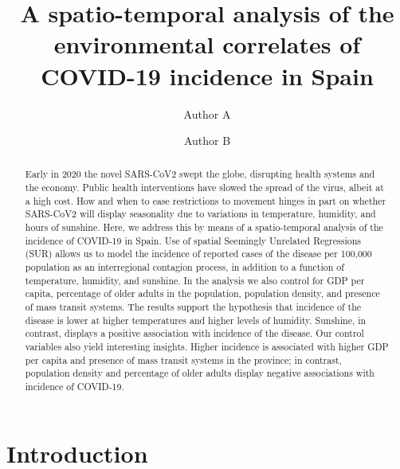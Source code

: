 \documentclass[]{elsarticle} %
\begin{document}
\begin{frontmatter}

  \title{A spatio-temporal analysis of the environmental correlates of COVID-19
incidence in Spain}
    \author[Some School]{Author A}
    \author[Some Institute]{Author B}
      \address[Some School]{School of the Things}
    \address[Some Institute]{Institute of Everything}
    \address[Departamento de Economia]{}
  
  \begin{abstract}
  Early in 2020 the novel SARS-CoV2 swept the globe, disrupting health
  systems and the economy. Public health interventions have slowed the
  spread of the virus, albeit at a high cost. How and when to ease
  restrictions to movement hinges in part on whether SARS-CoV2 will
  display seasonality due to variations in temperature, humidity, and
  hours of sunshine. Here, we address this by means of a spatio-temporal
  analysis of the incidence of COVID-19 in Spain. Use of spatial Seemingly
  Unrelated Regressions (SUR) allows us to model the incidence of reported
  cases of the disease per 100,000 population as an interregional
  contagion process, in addition to a function of temperature, humidity,
  and sunshine. In the analysis we also control for GDP per capita,
  percentage of older adults in the population, population density, and
  presence of mass transit systems. The results support the hypothesis
  that incidence of the disease is lower at higher temperatures and higher
  levels of humidity. Sunshine, in contrast, displays a positive
  association with incidence of the disease. Our control variables also
  yield interesting insights. Higher incidence is associated with higher
  GDP per capita and presence of mass transit systems in the province; in
  contrast, population density and percentage of older adults display
  negative associations with incidence of COVID-19.\\
  \end{abstract}
  
 \end{frontmatter}

\hypertarget{introduction}{%
\section{Introduction}\label{introduction}}
\end{document}
